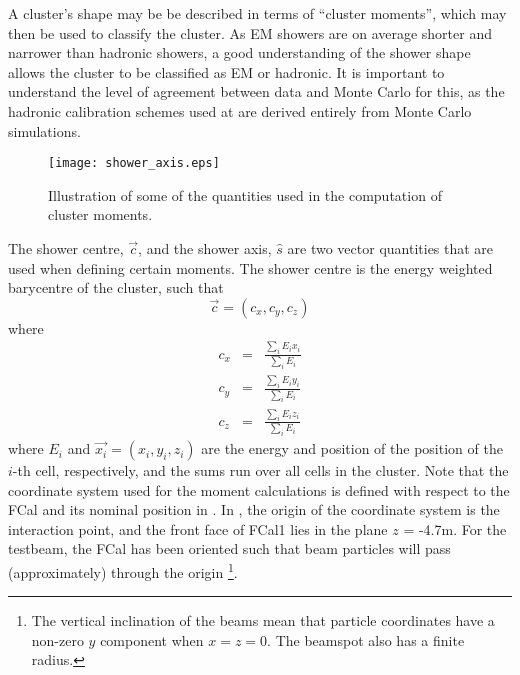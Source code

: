 A cluster's shape may be be described in terms of ``cluster moments'', which may then be used to classify the cluster. As EM showers are on average shorter and narrower than hadronic showers, a good understanding of the shower shape allows the cluster to be classified as EM or hadronic. It is important to understand the level of agreement between data and Monte Carlo for this, as the hadronic calibration schemes used at \atlas are derived entirely from Monte Carlo simulations.

%
%
%
\begin{figure}[!htb]
\begin{centering}
\texttt{[image: shower\_axis.eps]}
\label{shower_axis}
\caption[Shower moment definition]{Illustration of some of the quantities used in the computation of cluster moments\cite{calpub2010}.} 
\label{LC_moments_electrons}
\end{centering}
\end{figure}
The shower centre, $\vec{c}$, and the shower axis, $\hat{s}$ are two vector quantities that are used when defining certain moments. The shower centre is the energy weighted barycentre of the cluster, such that
\begin{equation}
\vec{c} = (c_x,c_y,c_z)
\end{equation}
where
\begin{eqnarray}
c_x & = & \frac{\sum_i E_i x_i}{\sum_i E_i}\\
c_y & = & \frac{\sum_i E_i y_i}{\sum_i E_i}\\
c_z & = & \frac{\sum_i E_i z_i}{\sum_i E_i}
\end{eqnarray}
where $E_i$ and $\vec{x_i} = (x_i,y_i,z_i)$ are the energy and position of the position of the $i$-th cell, respectively, and the sums run over all cells in the cluster. Note that the coordinate system used for the moment calculations is defined with respect to the FCal and its nominal position in \atlas. In \atlas, the origin of the coordinate system is the interaction point, and the front face of FCal1 lies in the plane $z$ = -4.7m. For the testbeam, the FCal has been oriented such that beam particles will pass (approximately) through the origin \footnote{The vertical inclination of the beams mean that particle coordinates have a non-zero $y$ component when $x = z = 0$. The beamspot also has a finite radius.}. 

